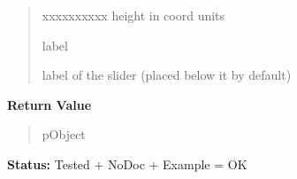 \begin{boxedminipage}{\funcwidth}
\begin{quote}
\begin{Ventry}{xxxxxxxxxx}
          height in coord units

          \item[label]

          label of the slider (placed below it by default)

        \end{Ventry}

      \end{quote}

      \textbf{Return Value}
    \vspace{-1ex}

      \begin{quote}
      pObject

      \end{quote}

\textbf{Status:} Tested + NoDoc + Example = OK



    \end{boxedminipage}

    \label{xformslib:library:fl_add_valslider}

    \vspace{0.5ex}

